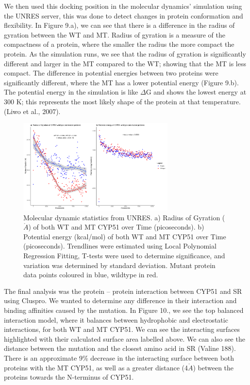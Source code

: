 \documentclass{bioinfo}
\begin{document}
We then used this docking position in the molecular dynamics' simulation
using the UNRES server, this was done to detect changes in protein
conformation and flexibility. In Figure 9.a), we can see that there is a
difference in the radius of gyration between the WT and MT. Radius of
gyration is a measure of the compactness of a protein, where the smaller
the radius the more compact the protein. As the simulation runs, we see
that the radius of gyration is significantly different and larger in the
MT compared to the WT; showing that the MT is less compact. The
difference in potential energies between two proteins were significantly
different, where the MT has a lower potential energy (Figure 9.b). The
potential energy in the simulation is like \(\Delta\)G and shows the
lowest energy at 300 K; this represents the most likely shape of the
protein at that temperature. (Liwo et al., 2007).\\

\begin{figure}[ht]
\center
\includegraphics[width=0.7\textwidth]{"bigger dynamics.pdf"}
\caption{\label{schema}Molecular dynamic statistics from UNRES. a) Radius of Gyration ($\mathring{A}$) of both WT and MT CYP51 over Time (picoseconds). b) Potential energy (kcal/mol) of both WT and MT CYP51 over Time (picoseconds). Trendlines were estimated using Local Polynomial Regression Fitting, T-tests were used to determine significance, and variation was determined by standard deviation.  Mutant protein data points coloured in blue, wildtype in red.}
\end{figure}

The final analysis was the protein -- protein interaction between CYP51
and SR using Cluspro. We wanted to determine any difference in their
interaction and binding affinities caused by the mutation. In Figure
10., we see the top balanced interaction model, where it balances
between hydrophobic and electrostatic interactions, for both WT and MT
CYP51. We can see the interacting surfaces highlighted with their
calculated surface area labelled above. We can also see the distance
between the mutation and the closest amino acid in SR (Valine 188).
There is an approximate 9\% decrease in the interacting surface between
both proteins with the MT CYP51, as well as a greater distance
(4\(\mathring{A}\)) between the proteins towards the N-terminus of
CYP51.
\end{document}
